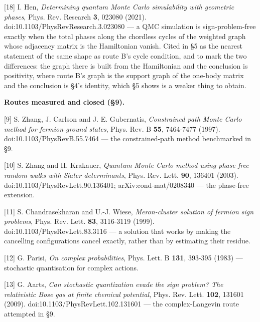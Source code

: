 \documentclass[10pt,letterpaper,twocolumn]{article}
\begin{document}
{[}18{]} I. Hen, \emph{Determining quantum Monte Carlo simulability with geometric phases}, Phys. Rev.
Research \textbf{3}, 023080 (2021). doi:\allowbreak{}10.\allowbreak{}1103/\allowbreak{}PhysRevR\allowbreak{}esearch.\allowbreak{}3.\allowbreak{}023080 --- a QMC simulation is
sign-problem-free exactly when the total phases along the chordless cycles of the weighted graph
whose adjacency matrix is the Hamiltonian vanish. Cited in §5 as the nearest statement of the same
shape as route B's cycle condition, and to mark the two differences: the graph there is built from
the Hamiltonian and the conclusion is positivity, where route B's graph is the support graph of the
one-body matrix and the conclusion is §4's identity, which §5 shows is a weaker thing to obtain.

\textbf{Routes measured and closed (§9).}

{[}9{]} S. Zhang, J. Carlson and J. E. Gubernatis, \emph{Constrained path Monte Carlo method for fermion
ground states}, Phys. Rev. B \textbf{55}, 7464-7477 (1997). doi:\allowbreak{}10.\allowbreak{}1103/\allowbreak{}PhysRevB\allowbreak{}.\allowbreak{}55.\allowbreak{}7464 --- the
constrained-path method benchmarked in §9.

{[}10{]} S. Zhang and H. Krakauer, \emph{Quantum Monte Carlo method using phase-free random walks with
Slater determinants}, Phys. Rev. Lett. \textbf{90}, 136401 (2003).
doi:\allowbreak{}10.\allowbreak{}1103/\allowbreak{}PhysRevL\allowbreak{}ett.\allowbreak{}90.\allowbreak{}136401; arXiv:cond-mat/0208340 --- the phase-free extension.

{[}11{]} S. Chandrasekharan and U.-J. Wiese, \emph{Meron-cluster solution of fermion sign problems},
Phys. Rev. Lett. \textbf{83}, 3116-3119 (1999). doi:\allowbreak{}10.\allowbreak{}1103/\allowbreak{}PhysRevL\allowbreak{}ett.\allowbreak{}83.\allowbreak{}3116 --- a solution that works
by making the cancelling configurations cancel exactly, rather than by estimating their residue.

{[}12{]} G. Parisi, \emph{On complex probabilities}, Phys. Lett. B \textbf{131}, 393-395 (1983) --- stochastic
quantisation for complex actions.

{[}13{]} G. Aarts, \emph{Can stochastic quantization evade the sign problem? The relativistic Bose gas at
finite chemical potential}, Phys. Rev. Lett. \textbf{102}, 131601 (2009).
doi:\allowbreak{}10.\allowbreak{}1103/\allowbreak{}PhysRevL\allowbreak{}ett.\allowbreak{}102.\allowbreak{}131601 --- the complex-Langevin route attempted in §9.
\end{document}
